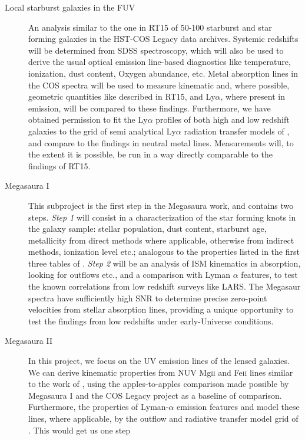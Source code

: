 \documentclass[12pt]{amsart}
\begin{document}
\begin{description}
	\item[Local starburst galaxies in the FUV] An analysis similar to the 
		one in RT15 of 50-100 starburst and star forming galaxies in the 
		HST-COS Legacy data archives. Systemic redshifts will be 
		determined from SDSS spectroscopy, which will also be used to 
		derive the usual optical emission line-based diagnostics like 
		temperature, ionization, dust content, Oxygen abundance, etc. 
		Metal absorption lines in the COS spectra will be used to
		measure kinematic and, where possible, geometric quantities
		like described in RT15, and Ly$\alpha$, where present in
		emission, will be compared to these findings. Furthermore,
		we have obtained permission to fit the Ly$\alpha$ profiles of 
		both high and low redshift galaxies to the grid of semi 
		analytical Ly$\alpha$ radiation transfer models of
		\cite{Schaerer2011}, and compare to the findings in neutral 
		metal lines. Measurements will, to the extent it is possible, 
		be run in a way directly comparable to the findings of RT15. 
	\item[Megasaura I] This subproject is the first step in the Megasaura 
		work, and contains two steps. \textit{Step 1} will consist in a
		characterization of the star forming knots in the galaxy
		sample: stellar population, dust content, starburst age,
		metallicity from direct methods where applicable, otherwise from
		indirect methods, ionization level etc.; analogous to the 
		properties listed in the first three tables of \citet{LARSI}.
		\textit{Step 2} will be an analysis of ISM kinematics in 
		absorption, looking for outflows etc., and a comparison with
		Lyman $\alpha$ features, to test the known correlations from low
		redshift surveys like LARS. The Megasaur spectra have
		sufficiently high SNR to determine precise zero-point velocities
		from stellar absorption lines, providing a unique opportunity to
		test the findings from low redshifts under early-Universe
		conditions.
	\item[Megasaura II] In this project, we focus on the UV
		emission lines of the lensed galaxies. We can derive kinematic
		properties from NUV Mg\textsc{ii} and Fe\textsc{ii} lines 
		similar to the work of \cite{Bordoloi2016}, using the
		apples-to-apples comparison made possible by Megasaura I and the
		COS Legacy project as a baseline of comparison. Furthermore, the
		properties of Lyman-$\alpha$ emission features and model these
		lines, where applicable, by the outflow and radiative transfer
		model grid of \cite{Schaerer2011}. This would get us one step

\end{description}
\end{document}

